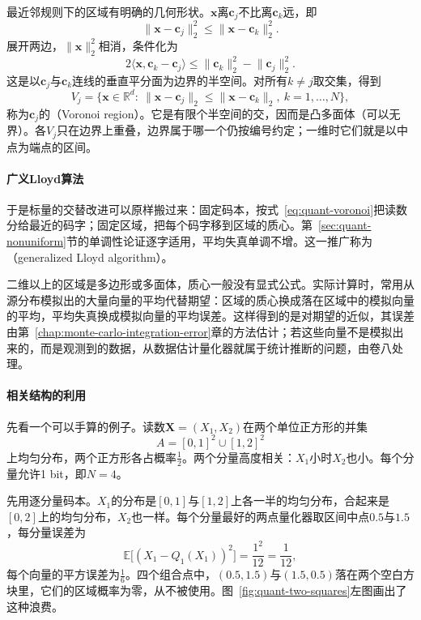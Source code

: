 最近邻规则下的区域有明确的几何形状。$\bm{x}$离$\bm{c}_j$不比离$\bm{c}_k$远，即
\[
 \lVert\bm{x}-\bm{c}_j\rVert_2^{2}\leq\lVert\bm{x}-\bm{c}_k\rVert_2^{2} .
\]
展开两边，$\lVert\bm{x}\rVert_2^{2}$相消，条件化为
\[
 2\langle\bm{x},\bm{c}_k-\bm{c}_j\rangle\leq\lVert\bm{c}_k\rVert_2^{2}-\lVert\bm{c}_j\rVert_2^{2} .
\]
这是以$\bm{c}_j$与$\bm{c}_k$连线的垂直平分面为边界的半空间。对所有$k\neq j$取交集，得到
\begin{equation}
 V_j=\bigl\{\bm{x}\in\mathbb{R}^{d}:\ \lVert\bm{x}-\bm{c}_j\rVert_2\leq\lVert\bm{x}-\bm{c}_k\rVert_2,\ k=1,\dots,N\bigr\} ,
 \label{eq:quant-voronoi}
\end{equation}
称为$\bm{c}_j$的（Voronoi region）。它是有限个半空间的交，因而是凸多面体（可以无界）。各$V_j$只在边界上重叠，边界属于哪一个仍按编号约定；一维时它们就是以中点为端点的区间。

\paragraph{广义Lloyd算法}
于是标量的交替改进可以原样搬过来：固定码本，按式~\eqref{eq:quant-voronoi}把读数分给最近的码字；固定区域，把每个码字移到区域的质心。第~\ref{sec:quant-nonuniform}节的单调性论证逐字适用，平均失真单调不增。这一推广称为（generalized Lloyd algorithm）。

二维以上的区域是多边形或多面体，质心一般没有显式公式。实际计算时，常用从源分布模拟出的大量向量的平均代替期望：区域的质心换成落在区域中的模拟向量的平均，平均失真换成模拟向量的平均误差。这样得到的是对期望的近似，其误差由第~\ref{chap:monte-carlo-integration-error}章的方法估计；若这些向量不是模拟出来的，而是观测到的数据，从数据估计量化器就属于统计推断的问题，由卷八处理。

\paragraph{相关结构的利用}
先看一个可以手算的例子。读数$\bm{X}=(X_1,X_2)$在两个单位正方形的并集
\[
 A=[0,1]^{2}\cup[1,2]^{2}
\]
上均匀分布，两个正方形各占概率$\tfrac12$。两个分量高度相关：$X_1$小时$X_2$也小。每个分量允许1 bit，即$N=4$。

先用逐分量码本。$X_1$的分布是$[0,1]$与$[1,2]$上各一半的均匀分布，合起来是$[0,2]$上的均匀分布，$X_2$也一样。每个分量最好的两点量化器取区间中点$0.5$与$1.5$，每分量误差为
\[
 \mathbb{E}\bigl[(X_1-Q_1(X_1))^{2}\bigr]=\frac{1^{2}}{12}=\frac{1}{12},
\]
每个向量的平方误差为$\tfrac16$。四个组合点中，$(0.5,1.5)$与$(1.5,0.5)$落在两个空白方块里，它们的区域概率为零，从不被使用。图~\ref{fig:quant-two-squares}左图画出了这种浪费。

